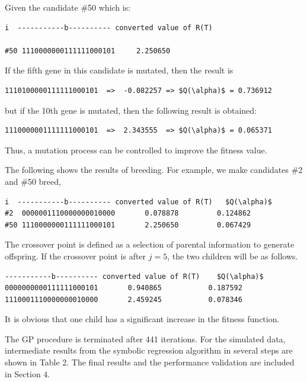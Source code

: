 \documentclass[final,5p,times,twocolumn]{elsarticle}
\begin{document}
Given the candidate \#50 which is:
\begin{lstlisting}
i  -----------b---------- converted value of R(T)

#50 1110000000111111000101     2.250650
\end{lstlisting}
If the fifth gene in this candidate is mutated, then the result is
\begin{lstlisting}
1110100000111111000101  =>  -0.082257 => $Q(\alpha)$ = 0.736912
\end{lstlisting}
but if the 10th gene is mutated, then the following result is obtained:
\begin{lstlisting}
1110000001111111000101  =>  2.343555  => $Q(\alpha)$ = 0.065371
\end{lstlisting}
Thus, a mutation process can be controlled to improve the fitness value.

The following shows the results of breeding. For example, we make candidates \#2 and \#50 breed, 
\begin{lstlisting}
i  -----------b---------- converted value of R(T)   $Q(\alpha)$
#2  0000001110000000010000       0.078878         0.124862
#50 1110000000111111000101       2.250650         0.067429
\end{lstlisting}
The crossover point is defined as a selection of parental information to generate offspring. 
If the crossover point is after $j=5$, the two children will be as follows. 
\begin{lstlisting}
-----------b---------- converted value of R(T)    $Q(\alpha)$
0000000000111111000101       0.940865           0.187592
1110001110000000010000       2.459245           0.078346
\end{lstlisting}
It is obvious that one child has a significant increase in the fitness function.

The GP procedure is terminated after 441 iterations. For the simulated data, intermediate results from the symbolic regression algorithm in several steps are shown in Table 2. The final results and the performance validation are included in Section 4. 
\end{document}
